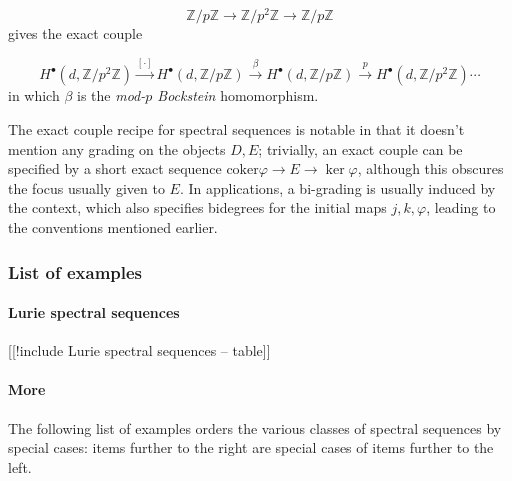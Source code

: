 \documentclass[12pt,titlepage]{article}
\theoremstyle{plain}
\theoremstyle{definition}
\theoremstyle{remark}
\begin{document}
\begin{displaymath}
\mathbb{Z}/p\mathbb{Z} \to \mathbb{Z}/p^2\mathbb{Z} \to \mathbb{Z}/p\mathbb{Z}
\end{displaymath}
gives the exact couple

\begin{displaymath}
H^\bullet(d,\mathbb{Z}/p^2\mathbb{Z})
    \overset{[\cdot]}{\to} 
  H^\bullet(d,\mathbb{Z}/p\mathbb{Z})
   \overset{\beta}{\to}
  H^\bullet(d,\mathbb{Z}/p\mathbb{Z})
   \overset{p}{\to}H^\bullet(d,\mathbb{Z}/p^2\mathbb{Z})\cdots
\end{displaymath}
in which $\beta$ is the \emph{mod-$p$ Bockstein} homomorphism.

The exact couple recipe for spectral sequences is notable in that it doesn't mention any grading on the objects $D,E$; trivially, an exact couple can be specified by a short exact sequence $\text{coker} \varphi\to E\to \ker\varphi$, although this obscures the focus usually given to $E$. In applications, a bi-grading is usually induced by the context, which also specifies bidegrees for the initial maps $j,k,\varphi$, leading to the conventions mentioned earlier.

\hypertarget{ListOfExamples}{}\subsubsection*{{List of examples}}\label{ListOfExamples}

\hypertarget{lurie_spectral_sequences}{}\paragraph*{{Lurie spectral sequences}}\label{lurie_spectral_sequences}

[[!include Lurie spectral sequences -- table]]

\hypertarget{more}{}\paragraph*{{More}}\label{more}

The following list of examples orders the various classes of spectral sequences by special cases: items further to the right are special cases of items further to the left.
\end{document}
